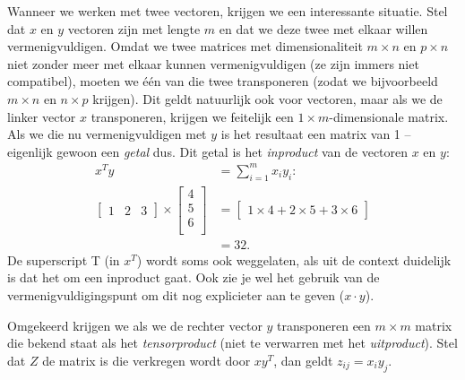 Wanneer we werken met twee vectoren, krijgen we een interessante situatie. Stel dat $x$ en $y$ vectoren zijn met lengte $m$ en dat we deze twee met elkaar willen vermenigvuldigen. Omdat we twee matrices met dimensionaliteit $m \times n$ en $p \times n$ niet zonder meer met elkaar kunnen vermenigvuldigen (ze zijn immers niet compatibel), moeten we één van die twee transponeren (zodat we bijvoorbeeld $m \times n$ en $n \times p$ krijgen). Dit geldt natuurlijk ook voor vectoren, maar als we de linker vector $x$ transponeren, krijgen we feitelijk een $1 \times m$-dimensionale matrix. Als we die nu vermenigvuldigen met $y$ is het resultaat een matrix van 1  – eigenlijk gewoon een \textit{getal} dus. Dit getal is het \textit{inproduct} van de vectoren $x$ en $y$:
\[
\begin{aligned}
x^Ty &= \sum_{i=1}^m{x_iy_i}: \\
\begin{bmatrix}
1 & 2 & 3
\end{bmatrix} \times
\begin{bmatrix}
4\\5\\6\\
\end{bmatrix} &= 
\begin{bmatrix}
1 \times 4 + 2 \times 5 + 3 \times 6
\end{bmatrix}\\
&=32.
\end{aligned}
\]
%
De superscript T (in $x^T$) wordt soms ook weggelaten, als uit de context duidelijk is dat het om een inproduct gaat. Ook zie je wel het gebruik van de vermenigvuldigingspunt om dit nog explicieter aan te geven ($x \cdot y$). 

Omgekeerd krijgen we als we de rechter vector $y$ transponeren een $m \times m$ matrix die bekend staat als het \textit{tensorproduct} (niet te verwarren met het \textit{uitproduct}). Stel dat $Z$ de matrix is die verkregen wordt door $xy^T$, dan geldt $z_{ij}=x_iy_j$. 

